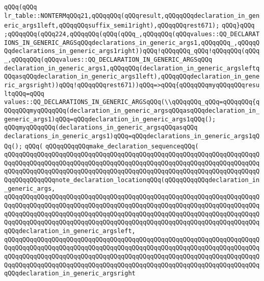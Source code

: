 \verb|qQQq(qQQq|\newline
\verb|lr_table::NONTERMqQQq21,qQQqqQQq(qQQqresult,qQQqqQQqdeclaration_in_generic_args1left,qQQqqQQqsuffix_semi1right),qQQqqQQqrest671);|\newline
\verb|qQQq}qQQq|\newline
\verb|;qQQqqQQq(qQQq224,qQQqqQQq(qQQq(qQQq_,qQQqqQQq(qQQqvalues::QQ_DECLARATIONS_IN_GENERIC_ARGSqQQqdeclarations_in_generic_args1,qQQqqQQq_,qQQqqQQqdeclarations_in_generic_args1right))qQQq!qQQqqQQq_qQQq!qQQqqQQq(qQQq_,qQQqqQQq(qQQqvalues::QQ_DECLARATION_IN_GENERIC_ARGSqQQq|\newline
\verb|declaration_in_generic_args1,qQQqqQQq(declaration_in_generic_argsleftqQQqasqQQqdeclaration_in_generic_args1left),qQQqqQQqdeclaration_in_generic_argsright))qQQq!qQQqqQQqrest671))qQQq=>qQQq{qQQqqQQqmyqQQqqQQqresultqQQq=qQQq|\newline
\verb|values::QQ_DECLARATIONS_IN_GENERIC_ARGSqQQq(\\qQQqqQQq_qQQq=qQQqqQQq{qQQqqQQqmyqQQqqQQq(declaration_in_generic_argsqQQqasqQQqdeclaration_in_generic_args1)qQQq=qQQqdeclaration_in_generic_args1qQQq();|\newline
\verb|qQQqmyqQQqqQQq(declarations_in_generic_argsqQQqasqQQq|\newline
\verb|declarations_in_generic_args1)qQQq=qQQqdeclarations_in_generic_args1qQQq();|\newline
\verb|qQQq(|\newline
\verb|qQQqqQQqqQQqmake_declaration_sequenceqQQq(|\newline
\verb|qQQqqQQqqQQqqQQqqQQqqQQqqQQqqQQqqQQqqQQqqQQqqQQqqQQqqQQqqQQqqQQqqQQqqQQqqQQqqQQqqQQqqQQqqQQqqQQqqQQqqQQqqQQqqQQqqQQqqQQqqQQqqQQqqQQqqQQqqQQqqQQqqQQqqQQqqQQqqQQqqQQqqQQqqQQqqQQqqQQqqQQqqQQqqQQqqQQqqQQqqQQqqQQqqQQqqQQqqQQqqQQqnote_declaration_locationqQQq(qQQqqQQqqQQqdeclaration_in_generic_args,|\newline
\verb|qQQqqQQqqQQqqQQqqQQqqQQqqQQqqQQqqQQqqQQqqQQqqQQqqQQqqQQqqQQqqQQqqQQqqQQqqQQqqQQqqQQqqQQqqQQqqQQqqQQqqQQqqQQqqQQqqQQqqQQqqQQqqQQqqQQqqQQqqQQqqQQqqQQqqQQqqQQqqQQqqQQqqQQqqQQqqQQqqQQqqQQqqQQqqQQqqQQqqQQqqQQqqQQqqQQqqQQqqQQqqQQqqQQqqQQqqQQqqQQqqQQqqQQqqQQqqQQqqQQqqQQqqQQqqQQqqQQqqQQqqQQqdeclaration_in_generic_argsleft,|\newline
\verb|qQQqqQQqqQQqqQQqqQQqqQQqqQQqqQQqqQQqqQQqqQQqqQQqqQQqqQQqqQQqqQQqqQQqqQQqqQQqqQQqqQQqqQQqqQQqqQQqqQQqqQQqqQQqqQQqqQQqqQQqqQQqqQQqqQQqqQQqqQQqqQQqqQQqqQQqqQQqqQQqqQQqqQQqqQQqqQQqqQQqqQQqqQQqqQQqqQQqqQQqqQQqqQQqqQQqqQQqqQQqqQQqqQQqqQQqqQQqqQQqqQQqqQQqqQQqqQQqqQQqqQQqqQQqqQQqqQQqqQQqqQQqdeclaration_in_generic_argsright|\newline
